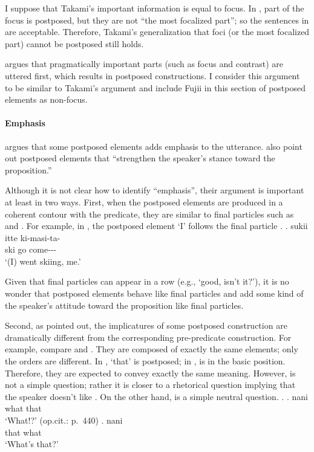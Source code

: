 I suppose that Takami's important information is equal to focus.
In \Last, part of the focus is postposed,
but they are not ``the most focalized part'';
so the sentences in \Last are acceptable.
Therefore,
Takami's generalization that foci (or the most focalized part) cannot be postposed still holds.

 argues that pragmatically important parts (such as focus and contrast) are uttered first,
which results in postposed constructions.
I consider this argument to be similar to Takami's argument and
include Fujii in this section of postposed elements as non-focus.


\paragraph{Emphasis}

 argues that some postposed elements adds emphasis to the utterance.
 also point out postposed elements that
``strengthen the speaker's stance toward the proposition.''

Although it is not clear how to identify ``emphasis'',
their argument is important at least in two ways.
First,
when the postposed elements are produced in a coherent contour with the predicate,
they are similar to final particles such as  and .
For example, in \Next,
the postposed element  `I' follows the final particle .
%
\exg. sukii itte ki-masi-ta-  \\
      ski go come---  \\
      `(I) went skiing, me.'
      \hfill{\cite[438]{onosuzuki92}}

Given that final particles can appear in a row (e.g.,  `good, isn't it?'),
it is no wonder that postposed elements behave like final particles
and add some kind of the speaker's attitude toward the proposition like final particles.

Second,
as  pointed out,
the implicatures of some postposed construction are dramatically different from the corresponding pre-predicate construction.
For example, compare \Next[a] and \Next[b].
They are composed of exactly the same elements;
only the orders are different.
In \Next[a],  `that' is postposed;
in \Next[b],  is in the basic position.
Therefore, they are expected to convey exactly the same meaning.
However, \Next[a] is not a simple question;
rather it is closer to a rhetorical question implying that the speaker doesn't like .
On the other hand, \Next[b] is a simple neutral question.
%
\ex.
 \ag. nani  \\
      what that \\
      `What!?'
      \hfill{(op.cit.: p.~440)}
 \bg.  nani \\
       that what \\
       `What's that?'


